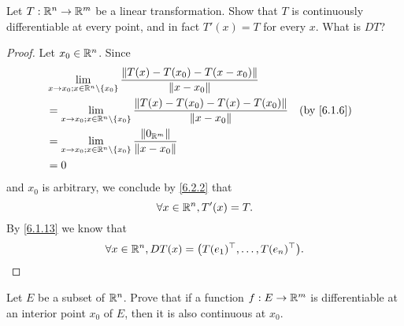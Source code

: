 \exercisesection

\begin{ex}\label{ex:6.4.1}
  Let \(T : \mathbb{R}^n \to \mathbb{R}^m\) be a linear transformation.
  Show that \(T\) is continuously differentiable at every point, and in fact \(T'(x) = T\) for every \(x\).
  What is \(D T\)?
\end{ex}

\begin{proof}
  Let \(x_0 \in \mathbb{R}^n\).
  Since
  \begin{align*}
     & \lim_{x \to x_0 ; x \in \R^n \setminus \{x_0\}} \dfrac{\norm*{T(x) - T(x_0) - T(x - x_0)}}{\norm*{x - x_0}}                      \\
     & = \lim_{x \to x_0 ; x \in \R^n \setminus \{x_0\}} \dfrac{\norm*{T(x) - T(x_0) - T(x) - T(x_0)}}{\norm*{x - x_0}} &  & \by{6.1.6} \\
     & = \lim_{x \to x_0 ; x \in \R^n \setminus \{x_0\}} \dfrac{\norm*{0_{\R^m}}}{\norm*{x - x_0}}                                      \\
     & = 0
  \end{align*}
  and \(x_0\) is arbitrary, we conclude by \cref{6.2.2} that
  \[
    \forall x \in \mathbb{R}^n, T'(x) = T.
  \]
  By \cref{6.1.13} we know that
  \[
    \forall x \in \mathbb{R}^n, D T(x) = \big(T(e_1)^\top, \dots, T(e_n)^\top\big).
  \]
\end{proof}

\begin{ex}\label{ex:6.4.2}
  Let \(E\) be a subset of \(\mathbb{R}^n\).
  Prove that if a function \(f : E \to \mathbb{R}^m\) is differentiable at an interior point \(x_0\) of \(E\), then it is also continuous at \(x_0\).
\end{ex}

